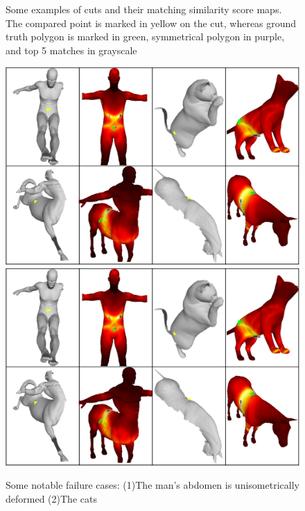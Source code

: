 \documentclass[10pt,twocolumn,letterpaper]{article}
\begin{document}
\begin{figure}[htb]
	\fi
	\caption{Some examples of cuts and their matching similarity score maps. The compared point is marked in yellow on the cut, whereas ground truth polygon is marked in green, symmetrical polygon in purple, and top 5 matches in grayscale}
\end{figure}

\begin{figure}[htb]
	\centering
	\ifpdf
	\includegraphics[width=1\textwidth]{figures/failures.png}
	\else
	\includegraphics[width=1\textwidth]{figures/failures.png}
	\fi
	\caption{Some notable failure cases: (1)The man's abdomen is unisometrically deformed (2)The cats  }
\end{figure}
{\small


}
\end{document}
